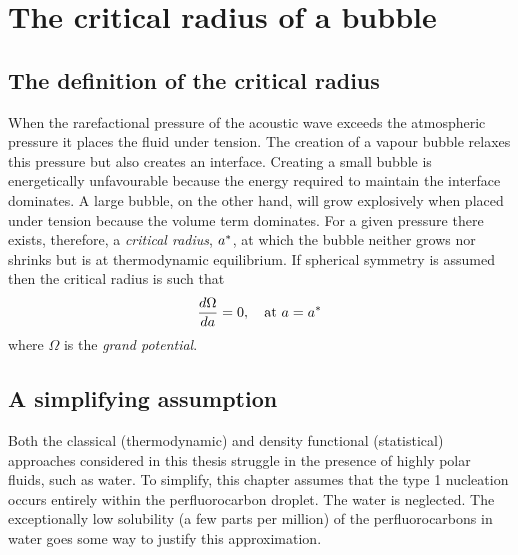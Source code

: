

\section{The critical radius of a bubble} \label{sec:nuc:radius}

\subsection{The definition of the critical radius}



When the rarefactional pressure of the acoustic wave exceeds the atmospheric pressure it places the fluid under tension.
The creation of a vapour bubble  relaxes this pressure but  also creates an interface.
Creating a small bubble is energetically unfavourable because the energy required to maintain the interface dominates.
A large bubble, on the other hand, will grow explosively when placed under tension because the volume term dominates.
For a given pressure there exists, therefore, a {\em critical radius}, ${a^\ast}$, at which the bubble neither grows nor shrinks 
but is at thermodynamic equilibrium.
If  spherical symmetry is assumed then 
the critical radius is such that\cite{Oxtoby1992,Oxtoby1988}
\begin{align}
  \frac{d \Omega}{d a} =0,\quad\text{at $a = {a^\ast}$} \label{eqn:DFT:astarR}
\end{align}
where $\Omega$ is the {\em grand potential}.

\subsection{A simplifying assumption}



Both the classical (thermodynamic) and density functional (statistical) approaches considered in this thesis struggle in the presence of highly polar fluids, such as water\cite{Talanquer2001, Nyquist1995}.
To simplify, this chapter assumes that the type 1 nucleation occurs entirely within 
the perfluorocarbon droplet.
The water is neglected.
The exceptionally low solubility (a few parts per million\cite{Wen1979}) of the perfluorocarbons in water goes some way to justify this approximation.
%

